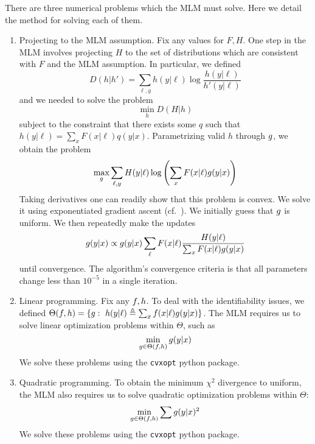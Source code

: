 \label{sec:optproblems}

There are three numerical problems which the MLM must solve.  Here we detail the \MLM{} method for solving each of them.

\begin{enumerate}

    \item Projecting to the MLM assumption.  Fix any values for $F,H$.  One step in the MLM involves projecting $H$ to the set of distributions which are consistent with $F$ and the MLM assumption.  In particular, we defined
    \[
    D(h|h') = \sum_{\ell,y} h(y|\ell) \log \frac{h(y|\ell)}{h'(y|\ell)}
    \]
    and we needed to solve the problem
    \[
    \min_{h} D(H|h)
    \]
    subject to the constraint that there exists some $q$ such that $h(y|\ell)=\sum_x F(x|\ell)q(y|x)$.  Parametrizing valid $h$ through $g$, we obtain the problem
    \[
    \max_{g} \sum_{\ell,y} H(y|\ell) \log \left(\sum_x F(x|\ell) g(y|x)\right)
    \]
    Taking derivatives one can readily show that this problem is convex.  We solve it using exponentiated gradient ascent (cf.\ \cite{kivinen1995additive}).  We initially guess that $g$ is uniform.  We then repeatedly make the updates
    \begin{align*}
    g(y|x)  &\propto g(y|x)\sum_{\ell}F(x|\ell)\frac{H(y|\ell)}{\sum_x F(x|\ell)g(y|x)}\\
    \end{align*}
    until convergence.  The algorithm's convergence criteria is that all parameters change less than $10^{-5}$ in a single iteration.

    \item Linear programming.  Fix any $f,h$.  To deal with the identifiability issues, we defined $\Theta(\plx,\ply)=\{\pxy:\ \ply(y|\ell) \triangleq \sum_x \plx(x|\ell)\pxy(y|x)\}$.  The MLM requires us to solve linear optimization problems within $\Theta$, such as 
    \[
    \min_{g\in \Theta(f,h)} g(y|x) \\
    \]
    We solve these problems using the {\tt cvxopt} python package.

    \item Quadratic programming.  To obtain the minimum $\chi^2$ divergence to uniform, the MLM also requires us to solve quadratic optimization problems within $\Theta$:
    \[
    \min_{g \in \Theta(f,h)} \sum g(y|x)^2 \\
    \]
    We solve these problems using the {\tt cvxopt} python package.


\end{enumerate}


